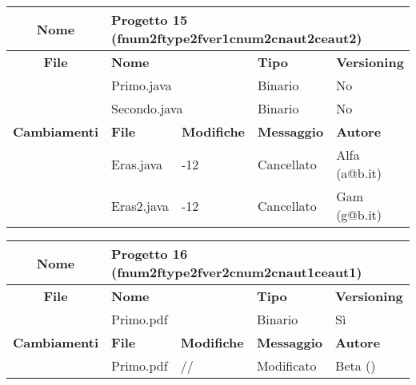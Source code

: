\begin{table}[ht]
\footnotesize
\begin{tabular}{|c|p{2.5cm}|p{2cm}|p{2.5cm}|p{2.5cm}|}
  \hline
  \textbf{Nome}	& \multicolumn{4}{l|}{Progetto 15 (fnum2ftype2fver1cnum2cnaut2ceaut2)} 									\\
  \hline
  \rowcolor{lightgray}\textbf{File} 		& \multicolumn{2}{l|}{\textbf{Nome}}		& \textbf{Tipo}		& \textbf{Versioning} 		\\
						\cline{2-5}
						& \multicolumn{2}{l|}{Primo.java}		& Binario		& No				\\
						\cline{2-5}
						& \multicolumn{2}{l|}{Secondo.java}		& Binario		& No				\\
  \hline
  \rowcolor{lightgray}\textbf{Cambiamenti}	& \textbf{File}		&\textbf{Modifiche}	& \textbf{Messaggio}	& \textbf{Autore}		\\
						\cline{2-5}
						& Eras.java		& -12	  		& Cancellato		& Alfa (a@b.it)			\\
						\cline{2-5}
						& Eras2.java		& -12	  		& Cancellato		& Gam (g@b.it)		\\
  \hline
\end{tabular}
\end{table}



\begin{table}[ht]
\footnotesize
\begin{tabular}{|c|p{2.5cm}|p{2cm}|p{2.5cm}|p{2.5cm}|}
  \hline
  \textbf{Nome}	& \multicolumn{4}{l|}{Progetto 16 (fnum2ftype2fver2cnum2cnaut1ceaut1)} 									\\
  \hline
  \rowcolor{lightgray}\textbf{File} 		& \multicolumn{2}{l|}{\textbf{Nome}}		& \textbf{Tipo}		& \textbf{Versioning} 		\\
						\cline{2-5}
						& \multicolumn{2}{l|}{Primo.pdf}		& Binario			& Sì				\\
  \hline
  \rowcolor{lightgray}\textbf{Cambiamenti}	& \textbf{File}		&\textbf{Modifiche}	& \textbf{Messaggio}	& \textbf{Autore}		\\
						\cline{2-5}
						& Primo.pdf		& //	 		& Modificato		& Beta ()			\\
						
  \hline
\end{tabular}
\end{table}

